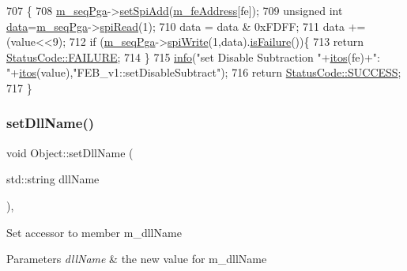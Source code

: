 \begin{DoxyCode}
707                                                          \{
708   \hyperlink{classFEB__v1_a6c7804ac86796f233a8393043adf2e77}{m\_seqPga}->\hyperlink{classSeqPGA_ac998ce3a6d9b5f2e88cc8393f8c1df53}{setSpiAdd}(\hyperlink{classFEB__v1_a4e1945c2d5b434125f375e9d0fc6d99f}{m\_feAddress}[fe]);
709   \textcolor{keywordtype}{unsigned} \textcolor{keywordtype}{int} \hyperlink{classFEB__v1_a6bca4320bd3bbbc32efc81097f33421a}{data}=\hyperlink{classFEB__v1_a6c7804ac86796f233a8393043adf2e77}{m\_seqPga}->\hyperlink{classSeqPGA_ab3d0e5e5d4014bc7a92588a76b8713d4}{spiRead}(1);
710   data = data & 0xFDFF;
711   data += (value<<9);
712   \textcolor{keywordflow}{if} (\hyperlink{classFEB__v1_a6c7804ac86796f233a8393043adf2e77}{m\_seqPga}->\hyperlink{classSeqPGA_ad4421841ce4ce8b88ad13f63216f0743}{spiWrite}(1,data).\hyperlink{classStatusCode_a5dd22dc6eb2c52fc4cabc58f6dea2eb7}{isFailure}())\{
713     \textcolor{keywordflow}{return} \hyperlink{classStatusCode_a6f565cbeadc76d14c72f047e5e85eb4ba3da73d4c469762eb9d3c960368252b26}{StatusCode::FAILURE};
714   \}
715   \hyperlink{classObject_a644fd329ea4cb85f54fa6846484b84a8}{info}(\textcolor{stringliteral}{"set Disable Subtraction "}+\hyperlink{Tools_8h_af330027dbdafb9a30768b3613c553e60}{itos}(fe)+\textcolor{stringliteral}{": "}+\hyperlink{Tools_8h_af330027dbdafb9a30768b3613c553e60}{itos}(value),\textcolor{stringliteral}{"FEB\_v1::setDisableSubtract"});
716   \textcolor{keywordflow}{return} \hyperlink{classStatusCode_a6f565cbeadc76d14c72f047e5e85eb4badd0da38d3ba0d922efd1f4619bc37ad8}{StatusCode::SUCCESS};
717 \}
\end{DoxyCode}
\mbox{\label{classObject_a870c5af919958c2136623b2d7816d123}} 
\subsubsection{\texorpdfstring{set\+Dll\+Name()}{setDllName()}}
{\footnotesize\ttfamily void Object\+::set\+Dll\+Name (\begin{DoxyParamCaption}\item[{std\+::string}]{dll\+Name }\end{DoxyParamCaption})\hspace{0.3cm}{\ttfamily [inline]}, {\ttfamily [inherited]}}

Set accessor to member m\+\_\+dll\+Name 
\begin{DoxyParams}{Parameters}
{\em dll\+Name} & the new value for m\+\_\+dll\+Name \\
\hline
\end{DoxyParams}


